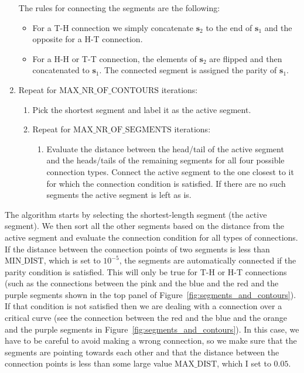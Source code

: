 \documentclass[12pt,dvipsnames]{report}
\begin{document}
\begin{enumerate}
    The rules for connecting the segments are the following:
    \begin{itemize}
        \item  For a T-H connection we simply concatenate $\mathbf{s}_2$ to the end of $\mathbf{s}_1$ 
        and the opposite for a H-T connection.
        \item For a H-H or T-T connection, the elements of $\mathbf{s}_2$ are flipped and then concatenated
        to $\mathbf{s}_1$. The connected segment is assigned the parity of $\mathbf{s}_1$.
    \end{itemize}
    \item Repeat for $\text{MAX\_NR\_OF\_CONTOURS}$ iterations:
    \begin{enumerate}
    \item Pick the shortest segment and label it as the active segment.
    \item Repeat for $\text{MAX\_NR\_OF\_SEGMENTS}$ iterations:
    \begin{enumerate}
    \item Evaluate the distance between the head/tail of the active segment and the 
    heads/tails of the remaining segments for all four possible connection types. 
    Connect the active segment to the one closest to it for which the connection 
    condition is satisfied.  If there are no such segments the active segment is left as is.
    \end{enumerate}
    \end{enumerate}
\end{enumerate}

The algorithm starts by selecting the shortest-length segment (the active segment). 
We then sort all the other segments based on the distance from the active segment and evaluate
the connection condition for all types of connections. If the distance between the connection
points of two segments is less than $\text{MIN\_DIST}$, which is set to $10^{-5}$, the segments
are automatically connected if the parity condition is satisfied. This will only be true 
for T-H or H-T connections (such as the connections between the pink and the blue and the red 
and the purple segments shown in the top panel of Figure~\ref{fig:segments_and_contours}).
If that condition is not satisfied then we are dealing with a connection over a critical curve 
(see the connection between the red and the blue and the orange and the purple segments 
in Figure~\ref{fig:segments_and_contours}).
In this case, we have to be careful to avoid making a wrong connection, so we make sure that the 
segments are pointing towards each other and that the distance between the connection points 
is less than some large value $\text{MAX\_DIST}$, which I set to $0.05$. 
\end{document}
